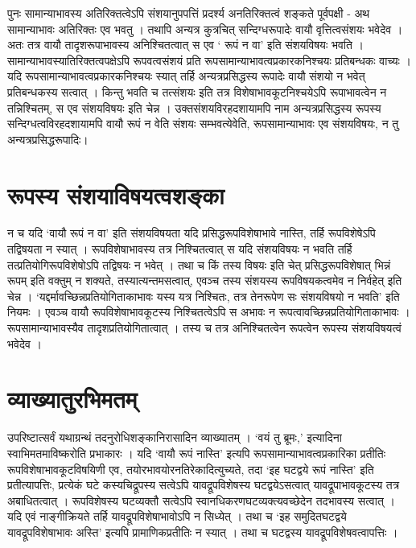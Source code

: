 पुनः सामान्याभावस्य अतिरिक्तत्वेऽपि संशयानुपपत्तिं प्रदर्श्य अनतिरिक्तत्वं शङ्कते पूर्वपक्षी - अथ सामान्याभावः अतिरिक्तः एव भवतु । तथापि अन्यत्र कुत्रचित् सन्दिग्धरूपादेः वायौ वृत्तित्वसंशयः भवेदेव । अतः तत्र वायौ तादृशरूपाभावस्य अनिश्चितत्वात् स एव ‘ रूपं न वा’ इति संशयविषयः भवति । सामान्याभावस्यातिरिक्तत्वपक्षेऽपि रूपवत्वसंशयं प्रति रूपसामान्याभावत्वप्रकारकनिश्चयः प्रतिबन्धकः वाच्यः । यदि रूपसामान्याभावत्वप्रकारकनिश्चयः स्यात् तर्हि अन्यत्रप्रसिद्धस्य रूपादेः वायौ संशयो न भवेत् प्रतिबन्धकस्य सत्वात् । किन्तु भवति च तत्संशयः इति तत्र विशेषाभावकूटनिश्चयेऽपि रूपाभावत्वेन  न तन्निश्चितम्, स एव संशयविषयः इति चेन्न । उक्तसंशयविरहदशायामपि नाम अन्यत्रप्रसिद्धस्य रूपस्य सन्दिग्धत्वविरहदशायामपि वायौ रूपं न वेति संशयः सम्भवत्येवेति, रूपसामान्याभावः एव संशयविषयः, न तु अन्यत्रप्रसिद्धरूपादिः।

\section*{रूपस्य संशयाविषयत्वशङ्का}   

न च यदि ‘वायौ रूपं न वा’ इति संशयविषयता यदि प्रसिद्धरूपविशेषाभावे नास्ति, तर्हि रूपविशेषेऽपि तद्विषयता न स्यात् । रूपविशेषाभावस्य तत्र निश्चितत्वात् स यदि संशयविषयः न भवति तर्हि तत्प्रतियोगिरूपविशेषोऽपि तद्विषयः न भवेत् । तथा च किं तस्य विषयः इति चेत् प्रसिद्धरूपविशेषात् भिन्नं रूपम् इति वक्तुम् न शक्यते, तस्यात्यन्तमसत्वात्, एवञ्च तस्य संशयस्य रूपविषयकत्वमेव न निर्वहेत् इति चेन्न । ‘यद्दर्मावच्छिन्नप्रतियोगिताकाभावः यस्य यत्र निश्चितः, तत्र तेनरूपेण सः  संशयविषयो न भवति’ इति नियमः । एवञ्च वायौ रूपविशेषाभावकूटस्य निश्चितत्वेऽपि स अभावः न रूपत्वावच्छिन्नप्रतियोगिताकाभावः । रूपसामान्याभावस्यैव तादृशप्रतियोगितात्वात् । तस्य च तत्र अनिश्चितत्वेन रूपत्वेन रूपस्य संशयविषयत्वं भवेदेव ।

\section*{व्याख्यातुरभिमतम्} 

उपरिष्टात्सर्वं यथाग्रन्थं तदनुरोधिशङ्कानिरासादिन व्याख्यातम् । ‘वयं तु ब्रूमः,’ इत्यादिना स्वाभिमतमाविष्करोति प्रभाकारः । यदि ‘वायौ रूपं नास्ति’ इत्यपि रूपसामान्याभावत्वप्रकारिका प्रतीतिः रूपविशेषाभावकूटविषयिणी एव, तयोरभावयोरनतिरेकादित्युच्यते, तदा ‘इह घटद्वये रूपं नास्ति’ इति प्रतीत्यापत्तिः, प्रत्येकं घटे कस्यचिद्रूपस्य सत्वेऽपि यावद्रूपविशेषस्य घटद्वयेऽसत्वात् यावद्रूपाभावकूटस्य तत्र अबाधितत्वात् । रूपविशेषस्य घटव्यक्तौ सत्वेऽपि स्वानधिकरणघटव्यक्त्यवच्छेदेन तदभावस्य सत्वात् । यदि एवं नाङ्गीक्रियते तर्हि यावद्रूपविशेषाभावोऽपि न सिध्येत् । तथा च ‘इह समुदितघटद्वये यावद्रूपविशेषाभावः अस्ति’ इत्यपि प्रामाणिकप्रतीतिः न स्यात् । तथा च घटद्वस्य यावद्रूपविशेषवत्वापत्तिः ।

